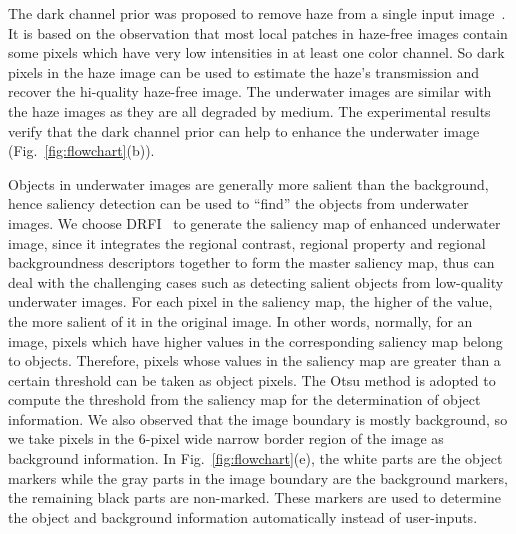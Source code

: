 \documentclass{article}
\begin{document}
The dark channel prior was proposed to remove haze from a single input image~\cite{he2011single}. It is based on the observation that most local patches in haze-free images contain some pixels which have very low intensities in at least one color channel. So dark pixels in the haze image can be used to estimate the haze's transmission and recover the hi-quality haze-free image. The underwater images are similar with the haze images as they are all degraded by medium. The experimental results verify that the dark channel prior can help to enhance the underwater image (Fig.~\ref{fig:flowchart}(b)).

Objects in underwater images are generally more salient than the background, hence saliency detection can be used to ``find'' the objects from underwater images. We choose DRFI~\cite{jiang2013salient} to generate the saliency map of enhanced underwater image, since it integrates the regional contrast, regional property and regional backgroundness descriptors together to form the master saliency map, thus can deal with the challenging cases such as detecting salient objects from low-quality underwater images. For each pixel in the saliency map, the higher of the value, the more salient of it in the original image. In other words, normally, for an image, pixels which have higher values in the corresponding saliency map belong to objects. Therefore, pixels whose values in the saliency map are greater than a certain threshold can be taken as object pixels. The Otsu method is adopted to compute the threshold from the saliency map for the determination of object information. We also observed that the image boundary is mostly background, so we take pixels in the $6$-pixel wide narrow border region of the image as background information. In Fig.~\ref{fig:flowchart}(e), the white parts are the object markers while the gray parts in the image boundary are the background markers, the remaining black parts are non-marked. These markers are used to determine the object and background information automatically instead of user-inputs.
\end{document}
